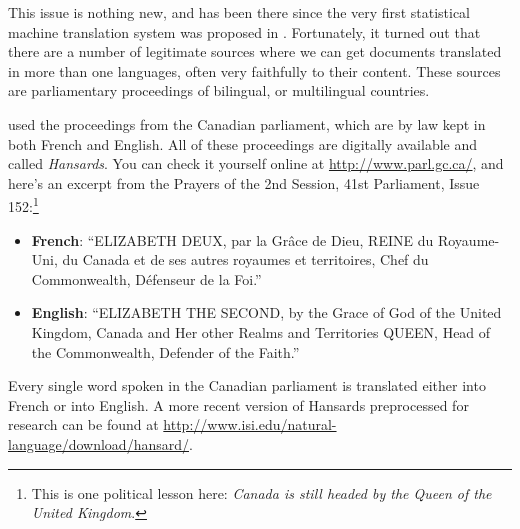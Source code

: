 \documentclass{report}
\begin{document}
This issue is nothing new, and has been there since the very first statistical
machine translation system was proposed in \citet{brown1990statistical}.
Fortunately, it turned out that there are a number of legitimate sources where
we can get documents translated in more than one languages, often very
faithfully to their content. These sources are parliamentary proceedings of
bilingual, or multilingual countries.

\citet{brown1990statistical} used the proceedings from the Canadian
parliament, which are by law kept in both French and English. All of these
proceedings are digitally available and called {\em Hansards}. You can check it
yourself online at \url{http://www.parl.gc.ca/}, and here's an excerpt from the
Prayers of the 2nd Session, 41st Parliament, Issue 152:\footnote{
    This is one political lesson here: {\em Canada is still headed by the Queen of
    the United Kingdom}.
}
\begin{itemize}
    \itemsep 0em
    \item \textbf{French}: ``ELIZABETH DEUX, par la Grâce de Dieu, REINE du
        Royaume-Uni, du Canada et de ses autres royaumes et territoires, Chef du
        Commonwealth, D\'efenseur de la Foi.''
    \item \textbf{English}: ``ELIZABETH THE SECOND, by the Grace of God of the
        United Kingdom, Canada and Her other Realms and Territories QUEEN, Head
        of the Commonwealth, Defender of the Faith.''
\end{itemize}
Every single word spoken in the Canadian parliament is translated either into
French or into English. A more recent version of Hansards preprocessed for
research can be found at
\url{http://www.isi.edu/natural-language/download/hansard/}.
\end{document}
